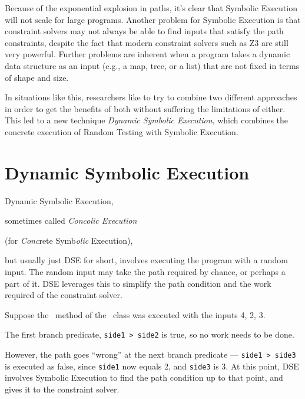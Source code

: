 Because of the exponential explosion in paths, it's clear that Symbolic
Execution will not scale for large programs. Another problem for Symbolic
Execution is that constraint solvers may not always be able to find inputs that
satisfy the path constraints, despite the fact that modern constraint solvers
such as Z3 are still very powerful. Further problems are inherent when a program
takes a dynamic data structure as an input (e.g., a map, tree, or a list) that
are not fixed in terms of shape and size. 

In situations like this, researchers like to try to combine two different
approaches in order to get the benefits of both without suffering the
limitations of either. This led to a new technique {\it Dynamic Symbolic
Execution}, which combines the concrete execution of Random Testing with
Symbolic Execution.

\section{Dynamic Symbolic Execution}


Dynamic Symbolic Execution, 


sometimes called {\it Concolic Execution} 


(for {\it Conc}rete Symb{\it olic} Execution), 


but usually just DSE for short, involves
executing the program with a random input. The random input may take the path
required by chance, or perhaps a part of it. DSE leverages this to simplify the
path condition and the work required of the constraint solver. 


Suppose the \classifymethod~method of the \triangleclass~class was executed with
the inputs 4, 2, 3. 


The first branch predicate, {\tt side1 > side2} is true, so
no work needs to be done. 


However, the path goes ``wrong'' at the next branch
predicate --- {\tt side1 > side3} is executed as false, since {\tt side1} now
equals 2, and {\tt side3} is 3. At this point, DSE involves Symbolic Execution
to find the path condition up to that point, and gives it to the constraint
solver. 

